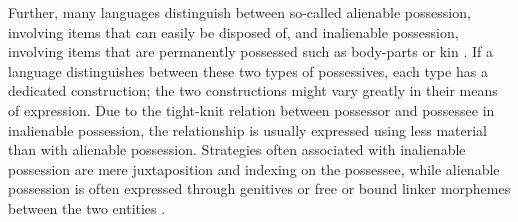 Further, many languages distinguish between so-called alienable possession, involving items that can easily be disposed of, and inalienable possession, involving items that are permanently possessed such as body-parts or kin \citep{Chappell:1996}. 
If a language distinguishes between these two types of possessives, each type has a dedicated construction; the two constructions might vary greatly in their means of expression. 
Due to the tight-knit relation between possessor and possessee in inalienable possession, the relationship is usually expressed using less material than with alienable possession. Strategies often associated with inalienable possession are mere juxtaposition and indexing on the possessee, while alienable possession is often expressed through genitives or free or bound linker morphemes between the two entities \citep[4--5]{Chappell:1996}.

